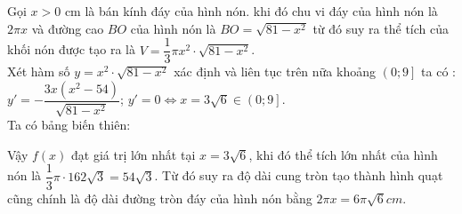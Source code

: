 \begin{ex}
{\begin{center}
		\end{center}
		Gọi $x>0$ cm là bán kính đáy của hình nón. khi đó chu vi đáy của hình nón là $2\pi x$ và đường cao $BO$ của hình nón là $BO=\sqrt{81-x^2}$ từ đó suy ra thể tích của khối nón được tạo ra là $V=\dfrac{1}{3}\pi x^2\cdot \sqrt{81-x^2}$.\\
		Xét hàm số $y=x^2\cdot \sqrt{81-x^2}$ xác định và liên tục trên nữa khoảng $\left(0;9\right]$ ta có :\\
		$y'=-\dfrac{3x(x^2-54)}{\sqrt{81-x^2}}$; $y'=0\Leftrightarrow x=3\sqrt{6}\in \left(0;9\right]$.\\
		Ta có bảng biến thiên: 
		\begin{center}
		\end{center}
		Vậy $f(x)$ đạt giá trị lớn nhất tại $x=3\sqrt{6}$, khi đó thể tích lớn nhất của hình nón là $\dfrac{1}{3}\pi\cdot 162\sqrt{3}=54\sqrt{3}$. Từ đó suy ra độ dài cung tròn tạo thành hình quạt cũng chính là độ dài đường tròn đáy của hình nón bằng $2\pi x=6\pi \sqrt{6}cm$.
	}
\end{ex}
